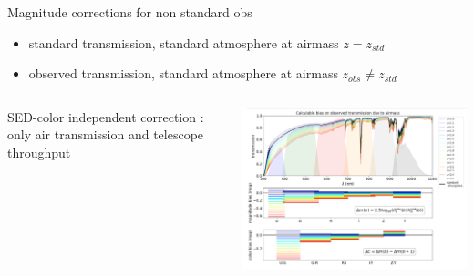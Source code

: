 \documentclass{beamer}
\begin{document}
\begin{frame}{Magnitude corrections for non standard obs}
\begin{itemize}
\item standard transmission, standard atmosphere at airmass $z=z_{std}$
\item observed transmission, standard atmosphere at airmass $z_{obs} \ne z_{std}$
\end{itemize}

\begin{columns}
\begin{column}{0.3\textwidth}
SED-color independent correction :\\ only air transmission and telescope throughput
\end{column}
\begin{column}{0.65\textwidth}  %
    \includegraphics[width=8cm,angle=0]{figs/PCCorr/PCCorrOrder0th_airmass.png}
\end{column}
\end{columns}
   
\end{frame}
\end{document}
